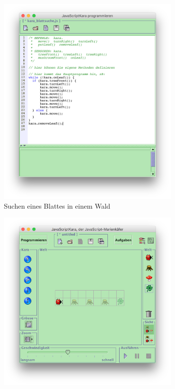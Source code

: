 \begin{figure}
    \begin{subfigure}[b]{0.5\textwidth}
        \includegraphics[width=\textwidth]{gfx/related-kara-code.png}
        \caption{Suchen eines Blattes in einem Wald}
        \label{fig:related:kara:code}
    \end{subfigure}
    \begin{subfigure}[b]{0.5\textwidth}
        \includegraphics[width=\textwidth]{gfx/related-kara-world.png}

\end{subfigure}
\end{figure}
